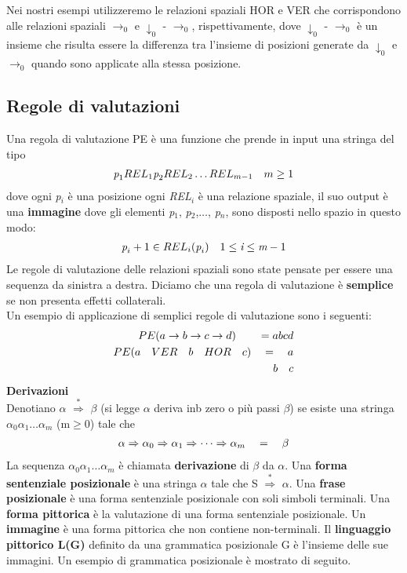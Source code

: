 Nei nostri esempi utilizzeremo le relazioni spaziali HOR e VER che corrispondono alle relazioni spaziali $\to_0$ e $\downarrow_0$ - $\to_0$, rispettivamente, dove $\downarrow_0$ - $\to_0$ è un insieme che risulta essere la differenza tra l'insieme di posizioni generate da $\downarrow_0$ e $\to_0$ quando sono applicate alla stessa posizione. 
\subsection{Regole di valutazioni}
Una regola di valutazione PE \cite{pubblicazione: tomita} è una funzione che prende in input una stringa del tipo 
\begin{align}
	\textit{p}_1 REL_1 \textit{p}_2 REL_2 \dots REL_{m-1} \quad    m \ge 1 \notag
\end{align}
dove ogni \textit{p}$_i$ è una posizione ogni \textit{REL}$_i$ è una relazione spaziale, il suo output è una \textbf{immagine} dove gli elementi \textit{p}$_1$, \textit{p}$_2$,$\dots$, \textit{p}$_n$, sono disposti nello spazio in questo modo:
\begin{align}
	\textit{p}_i+1 \in REL_i (\textit{p}_i)  \quad    1\le \textit{i} \le \textit{m}-1 \notag
\end{align}
Le regole di valutazione delle relazioni spaziali sono state pensate per essere una sequenza da sinistra a destra. Diciamo che una regola di valutazione è \textbf{semplice} se non presenta effetti collaterali. \\
Un esempio di applicazione di semplici regole di valutazione sono i seguenti:
\begin{align}
	PE(a \to b \to c \to d) \quad \quad = a b c d \notag \\ 
		PE(a \quad VER \quad b \quad HOR \quad c) \quad  = \quad a \notag \\ 
		                                                              b \quad  c \notag 
\end{align}
\textbf{Derivazioni}\\
Denotiano $\alpha$ $\overset{*}{\Rightarrow}$ $\beta$ (si legge  $\alpha$ deriva inb zero o più passi $\beta$) se esiste una stringa $\alpha_0$$\alpha_1$$\dots$$\alpha_m$ (m$\ge$0) tale che
\begin{align}
	\alpha \Rightarrow \alpha_0 \Rightarrow \alpha_1 \Rightarrow \dots \Rightarrow  \alpha_m \quad = \quad \beta  \notag
\end{align}
La sequenza $\alpha_0$$\alpha_1$$\dots$$\alpha_m$ è chiamata \textbf{derivazione} di $\beta$ da $\alpha$. Una \textbf{forma sentenziale posizionale} è una stringa $\alpha$ tale che S $\overset{*}{\Rightarrow}$ $\alpha$. Una \textbf{frase posizionale} è una forma sentenziale posizionale con soli simboli terminali. Una \textbf{forma pittorica} è la valutazione di una forma sentenziale posizionale. Un \textbf{immagine} è una forma pittorica che non contiene non-terminali. Il \textbf{linguaggio pittorico L(G)} definito da una grammatica posizionale G è l'insieme delle sue immagini. Un esempio di grammatica posizionale è mostrato di seguito.
